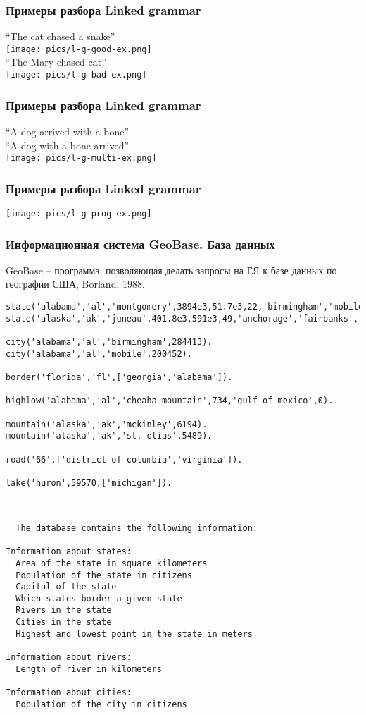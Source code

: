 \documentclass[10pt]{beamer}
\newcommand{\ltprgsize}{\fontsize{5}{5}\selectfont}
\begin{document}
\begin{frame}
  \frametitle{Примеры разбора Linked grammar}
  \centering
  “The cat chased a snake”\\
  \texttt{[image: pics/l-g-good-ex.png]}\\[1em]
  “The Mary chased cat”\\
  \texttt{[image: pics/l-g-bad-ex.png]}
\end{frame}

\begin{frame}
  \frametitle{Примеры разбора Linked grammar}
  \centering
  “A dog arrived with a bone”\\
  “A dog with a bone arrived”\\
  \texttt{[image: pics/l-g-multi-ex.png]}\\[1em]
\end{frame}

\begin{frame}
  \frametitle{Примеры разбора Linked grammar}
  \centering
  \texttt{[image: pics/l-g-prog-ex.png]}\\[1em]
\end{frame}

\begin{frame}
  \frametitle{Информационная система GeoBase. База данных}
  GeoBase -- программа, позволяющая делать запросы на ЕЯ к базе данных по географии США, Borland, 1988.
\begin{verbatim}
state('alabama','al','montgomery',3894e3,51.7e3,22,'birmingham','mobile','montgomery','huntsville').
state('alaska','ak','juneau',401.8e3,591e3,49,'anchorage','fairbanks','juneau','sitka').

city('alabama','al','birmingham',284413).
city('alabama','al','mobile',200452).

border('florida','fl',['georgia','alabama']).

highlow('alabama','al','cheaha mountain',734,'gulf of mexico',0).

mountain('alaska','ak','mckinley',6194).
mountain('alaska','ak','st. elias',5489).

road('66',['district of columbia','virginia']).

lake('huron',59570,['michigan']).
\end{verbatim}
  {\ttfamily\ltprgsize
\begin{verbatim}


  The database contains the following information:

Information about states:
  Area of the state in square kilometers
  Population of the state in citizens
  Capital of the state
  Which states border a given state
  Rivers in the state
  Cities in the state
  Highest and lowest point in the state in meters

Information about rivers:
  Length of river in kilometers

Information about cities:
  Population of the city in citizens
\end{verbatim}}
\end{frame}
\end{document}
